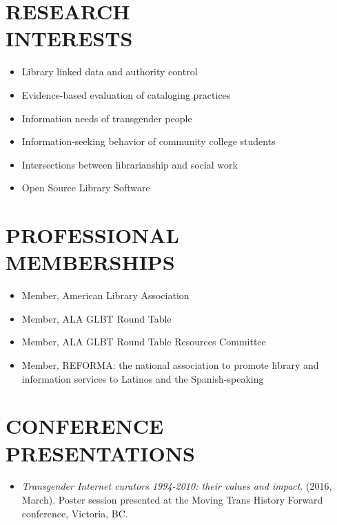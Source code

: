 \documentclass[line,margin]{res}
\begin{document}
\begin{resume}
\section{RESEARCH \\ INTERESTS}
\begin{itemize}
\item Library linked data and authority control
\item Evidence-based evaluation of cataloging practices
\item Information needs of transgender people
\item Information-seeking behavior of community college students
\item Intersections between librarianship and social work
\item Open Source Library Software
\end{itemize}

\vspace{12pt}


\section{PROFESSIONAL \\ MEMBERSHIPS}
\begin{itemize}
 \item Member, American Library Association
 \item Member, ALA GLBT Round Table
 \item Member, ALA GLBT Round Table Resources Committee
 \item Member, REFORMA: the national association to promote library and information services to Latinos and the Spanish-speaking
\end{itemize}

\vspace{12pt}

\section{CONFERENCE \\ PRESENTATIONS}
\begin{itemize}
 \item \emph{Transgender Internet curators 1994-2010: their values and impact}. (2016, March). Poster session presented at the Moving Trans History Forward conference, Victoria, BC.
\end{itemize}

\end{resume}
\end{document}
